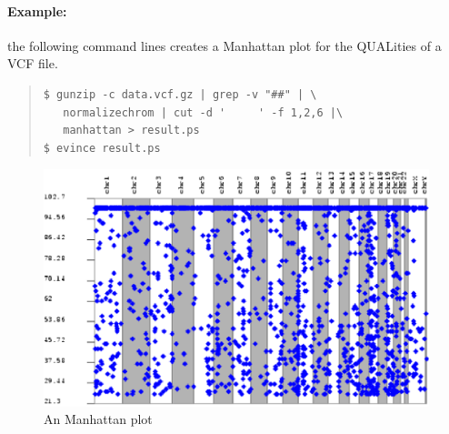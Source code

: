 \documentclass[12pt]{article}
\begin{document}
\paragraph{Example:}
the following command lines creates a Manhattan plot for the QUALities of a VCF file.
\begin{quote}
\begin{verbatim}
$ gunzip -c data.vcf.gz | grep -v "##" | \
   normalizechrom | cut -d '     ' -f 1,2,6 |\
   manhattan > result.ps
$ evince result.ps
\end{verbatim}
\end{quote}

\begin{figure}
\includegraphics{manhattan.eps}
\caption{An Manhattan plot}
\end{figure}
\end{document}
